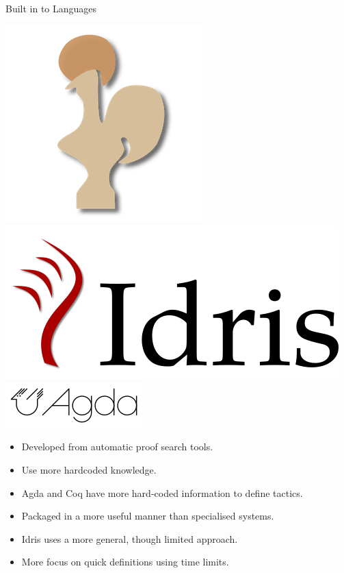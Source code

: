 \documentclass[presentation]{beamer}
\begin{document}
\begin{frame}[fragile]{Built in to Languages}
\begin{center}
  \includegraphics[scale=0.2]{Resource/coq.png}
  \includegraphics[scale=0.15]{Resource/idris-logo.png}
  \includegraphics[scale=0.2]{Resource/agda.png}
\end{center}

  \begin{itemize}
  \item Developed from automatic proof search tools.
  \item Use more hardcoded knowledge.
  \item Agda and Coq have more hard-coded information to define tactics.
  \item Packaged in a more useful manner than specialised systems.
  \item Idris uses a more general, though limited approach. 
  \item More focus on quick definitions using time limits.
  \end{itemize}
\end{frame}
\end{document}
